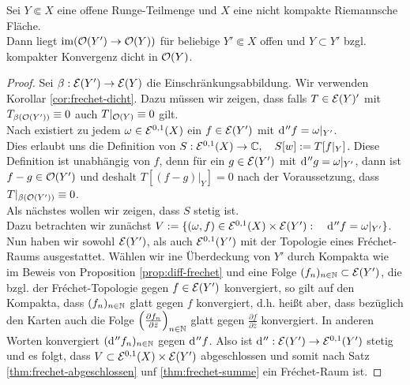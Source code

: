 \begin{thm}
  \label{thm:runge-dicht}
  Sei $Y \Subset X$ eine offene Runge-Teilmenge und $X$ eine nicht
  kompakte Riemannsche Fläche. \\
  Dann liegt $\operatorname{im}( \mathcal{O}(Y') \rightarrow \mathcal{O}(Y))$ für beliebige $Y' \Subset X$
  offen und $Y \subset Y'$ bzgl. kompakter Konvergenz dicht in $\mathcal{O}(Y)$.
\end{thm}

\begin{proof}
  Sei $\beta: \mathcal{E}(Y') \rightarrow \mathcal{E}(Y)$ die Einschränkungsabbildung. Wir
  verwenden Korollar \ref{cor:frechet-dicht}. Dazu müssen wir zeigen, dass falls $T \in
  \mathcal{E}(Y)'$ mit $T_{\beta(\mathcal{O}(Y'))} \equiv 0$ auch $T|_{\mathcal{O}(Y)}
  \equiv 0$ gilt. \\
  Nach \cite[Kor. 14.16]{For} existiert zu jedem $\omega \in \mathcal{E}^{0,1}(X)$ ein $f \in
  \mathcal{E}(Y')$ mit $\d[''f] = \omega|_{Y'}$. \\
  Dies erlaubt uns die Definition von $S: \mathcal{E}^{0,1}(X) \rightarrow \mathbb{C}, \quad
  S[w] := T[f|_Y]$. Diese Definition ist unabhängig von $f$, denn für
  ein $g \in \mathcal{E}(Y')$ mit $\d[''g] = \omega|_{Y'}$, dann ist $f-g
  \in \mathcal{O}(Y')$ und deshalt $T[(f-g)|_Y] = 0$ nach der Voraussetzung,
  dass $T|_{\beta(\mathcal{O}(Y'))} \equiv 0$. \\
  Als nächstes wollen wir zeigen, dass $S$ stetig ist. \\
  Dazu betrachten wir zunächst $V := \{ (\omega, f) \in \diff^{0,1}(X)
  \times \diff(Y'): \quad \d[''f] = \omega|_{Y'} \}$. Nun haben wir
  sowohl $\mathcal{E}(Y')$, als auch $\mathcal{E}^{0,1}(Y')$ mit der Topologie
  eines Fr\'echet-Raums ausgestattet. Wählen wir ine Überdeckung von
  $Y'$ durch Kompakta wie im Beweis von Proposition
  \ref{prop:diff-frechet} und eine Folge $(f_n)_{n\in \mathbb{N}} \subset
  \mathcal{E}(Y')$, die bzgl. der Fr\'echet-Topologie gegen $f \in \mathcal{E}(Y')$
  konvergiert, so gilt auf den Kompakta, dass $(f_n)_{n\in \mathbb{N}}$ glatt
  gegen $f$ konvergiert, d.h. heißt aber, dass bezüglich den Karten
  auch die Folge $\left(\frac{\partial f_n}{\partial \bar z} \right
  )_{n \in\mathbb{N}}$ glatt gegen $\frac{\partial f}{\partial \bar
      z}$ konvergiert. In anderen Worten konvergiert
    $(\d[''f_n])_{n\in \N}$ gegen $\d[''f]$. Also ist 
  $\d['']: \diff(Y') \ra \diff^{0,1}(Y')$ stetig und es folgt, dass $V
  \subset \mathcal{E}^{0,1}(X) \times \mathcal{E}(Y')$ abgeschlossen und somit
  nach Satz \ref{thm:frechet-abgeschlossen} unf \ref{thm:frechet-summe} ein
  Fr\'echet-Raum ist.
  

\end{proof}
